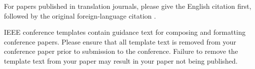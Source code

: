 \documentclass[conference]{IEEEtran}
\begin{document}
For papers published in translation journals, please give the English 
citation first, followed by the original foreign-language citation \cite{b6}.




\vspace{12pt}
\color{red}
IEEE conference templates contain guidance text for composing and formatting conference papers. Please ensure that all template text is removed from your conference paper prior to submission to the conference. Failure to remove the template text from your paper may result in your paper not being published.
\end{document}
